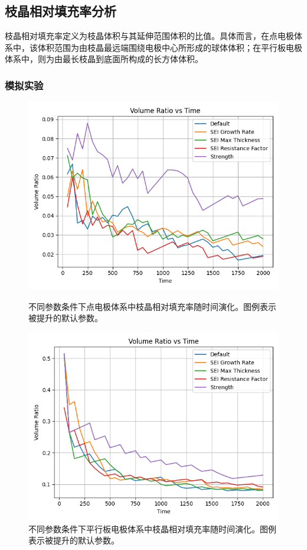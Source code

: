 \documentclass{article}
\begin{document}
 \subsection{枝晶相对填充率分析}
枝晶相对填充率定义为枝晶体积与其延伸范围体积的比值。具体而言，在点电极体系中，该体积范围为由枝晶最远端围绕电极中心所形成的球体体积；在平行板电极体系中，则为由最长枝晶到底面所构成的长方体体积。
\subsubsection{模拟实验}
     \begin{figure}[H]
            \centering
            \begin{minipage}{0.45\textwidth}
\centering
 \includegraphics[scale=0.45]{figs/point_volume_ratio_comparison.png}
\caption{不同参数条件下点电极体系中枝晶相对填充率随时间演化。图例表示被提升的默认参数。}
            \end{minipage}
            \hfill %
            \begin{minipage}{0.45\textwidth}
 \centering
 \includegraphics[scale=0.45]{figs/parallel_volume_ratio_comparison.png}
\caption{不同参数条件下平行板电极体系中枝晶相对填充率随时间演化。图例表示被提升的默认参数。}
            \end{minipage}
        \end{figure}
\end{document}

